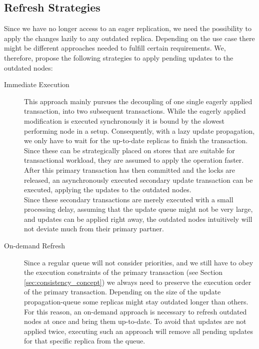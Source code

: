 \subsection{Refresh Strategies}
\label{sec:refresh_strategies}

Since we have no longer access to an eager replication, we need the possibility to apply the changes lazily to any outdated replica.
Depending on the use case there might be different approaches needed to fulfill certain requirements.
We, therefore, propose the following strategies to apply pending updates to the outdated nodes:

\begin{description}
    \item[Immediate Execution] This approach mainly pursues the decoupling of one single eagerly applied transaction, into two subsequent transactions.
    While the eagerly applied modification is executed synchronously it is bound by the slowest performing node in a setup.
    Consequently, with a lazy update propagation, we only have to wait for the up-to-date replicas to finish the transaction.
    Since these can be strategically placed on stores that are suitable for transactional workload, they are assumed to apply the operation faster.
    After this primary transaction has then committed and the locks are released, an asynchronously executed secondary update transaction can be executed, 
    applying the updates to the outdated nodes.\\
    Since these secondary transactions are merely executed with a small processing delay, assuming that the update queue might not be very large, 
    and updates can be applied right away, the outdated nodes intuitively will not deviate much from their primary partner.

    \item[On-demand Refresh] Since a regular queue will not consider priorities, and we still have to obey the execution constraints of the primary transaction (see Section \ref{sec:consistency_concept})
    we always need to preserve the execution order of the primary transaction. Depending on the size of the update propagation-queue some replicas might stay outdated longer than others.
    For this reason, an on-demand approach is necessary to refresh outdated nodes at once and bring them up-to-date.
    To avoid that updates are not applied twice, executing such an approach will remove all pending updates for that specific replica from the queue.
    

\end{description}
